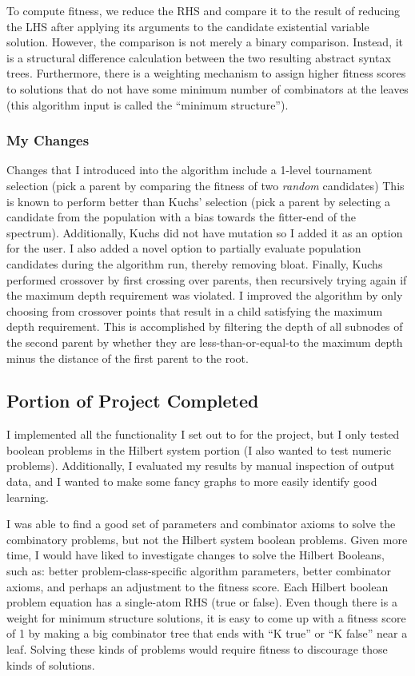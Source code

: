 \documentclass{article}
\begin{document}
To compute fitness, we reduce the RHS and compare it to the result of
reducing the LHS after applying its arguments to the candidate
existential variable solution. However, the comparison is not merely a
binary comparison. Instead, it is a structural difference calculation
between the two resulting abstract syntax trees. Furthermore, there is a
weighting mechanism to assign higher fitness scores to solutions that
do not have some minimum number of combinators at the leaves (this
algorithm input is called the ``minimum structure'').

\subsubsection{My Changes}

Changes that I introduced into the algorithm include a 1-level
tournament selection (pick a parent by comparing the fitness of two
\textit{random} candidates)
This is known to perform better than Kuchs' selection (pick a parent
by selecting a candidate from the population with a bias towards the
fitter-end of the spectrum).
Additionally, Kuchs did not have mutation so I added it as an option
for the user.
I also added a novel option to partially evaluate population
candidates during the algorithm run, thereby removing bloat. Finally,
Kuchs performed crossover by first crossing over parents, then
recursively trying again if the maximum depth requirement was
violated. I improved the algorithm by only choosing from crossover
points that result in a child satisfying the maximum depth
requirement. This is accomplished by filtering the depth of all
subnodes of the second parent by whether they are
less-than-or-equal-to the maximum depth minus the distance of the
first parent to the root.

\subsection{Portion of Project Completed}

I implemented all the functionality I set out to for the project, but
I only tested boolean problems in the Hilbert system portion (I also wanted to
test numeric problems). Additionally, I
evaluated my results by manual inspection of output data, and I wanted
to make some fancy graphs to more easily identify good learning.

I was able to find a good set of parameters and combinator axioms to solve the
combinatory problems, but not the Hilbert system boolean problems.
Given more time, I would have liked to investigate changes to solve
the Hilbert Booleans, such as: better problem-class-specific algorithm
parameters, better combinator axioms, and perhaps an adjustment to the
fitness score. Each Hilbert boolean problem equation has a single-atom
RHS (true or false). Even though there is a weight for minimum
structure solutions, it is easy to come up with a fitness score of 1
by making a big combinator tree that ends with
``K true'' or ``K false'' near a leaf. Solving these kinds of problems
would require fitness to discourage those kinds of solutions.
\end{document}
